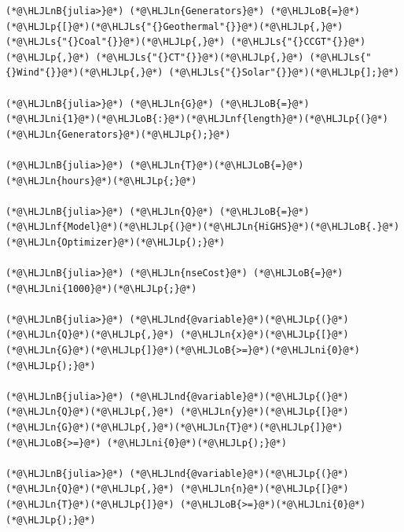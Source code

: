 \documentclass[12pt,a4paper]{article}
\newcommand{\HLJLn}[1]{#1}
\newcommand{\HLJLnd}[1]{\textcolor[RGB]{214,102,97}{#1}}
\newcommand{\HLJLnf}[1]{\textcolor[RGB]{66,102,213}{#1}}
\newcommand{\HLJLs}[1]{\textcolor[RGB]{201,61,57}{#1}}
\newcommand{\HLJLnB}[1]{\textcolor[RGB]{59,151,46}{#1}}
\newcommand{\HLJLni}[1]{\textcolor[RGB]{59,151,46}{#1}}
\newcommand{\HLJLoB}[1]{\textcolor[RGB]{102,102,102}{\textbf{#1}}}
\newcommand{\HLJLp}[1]{#1}
\begin{document}
\begin{lstlisting}
(*@\HLJLnB{julia>}@*) (*@\HLJLn{Generators}@*) (*@\HLJLoB{=}@*) (*@\HLJLp{[}@*)(*@\HLJLs{"{}Geothermal"{}}@*)(*@\HLJLp{,}@*) (*@\HLJLs{"{}Coal"{}}@*)(*@\HLJLp{,}@*) (*@\HLJLs{"{}CCGT"{}}@*)(*@\HLJLp{,}@*) (*@\HLJLs{"{}CT"{}}@*)(*@\HLJLp{,}@*) (*@\HLJLs{"{}Wind"{}}@*)(*@\HLJLp{,}@*) (*@\HLJLs{"{}Solar"{}}@*)(*@\HLJLp{];}@*)

(*@\HLJLnB{julia>}@*) (*@\HLJLn{G}@*) (*@\HLJLoB{=}@*) (*@\HLJLni{1}@*)(*@\HLJLoB{:}@*)(*@\HLJLnf{length}@*)(*@\HLJLp{(}@*)(*@\HLJLn{Generators}@*)(*@\HLJLp{);}@*)

(*@\HLJLnB{julia>}@*) (*@\HLJLn{T}@*)(*@\HLJLoB{=}@*) (*@\HLJLn{hours}@*)(*@\HLJLp{;}@*)

(*@\HLJLnB{julia>}@*) (*@\HLJLn{Q}@*) (*@\HLJLoB{=}@*) (*@\HLJLnf{Model}@*)(*@\HLJLp{(}@*)(*@\HLJLn{HiGHS}@*)(*@\HLJLoB{.}@*)(*@\HLJLn{Optimizer}@*)(*@\HLJLp{);}@*)

(*@\HLJLnB{julia>}@*) (*@\HLJLn{nseCost}@*) (*@\HLJLoB{=}@*) (*@\HLJLni{1000}@*)(*@\HLJLp{;}@*)

(*@\HLJLnB{julia>}@*) (*@\HLJLnd{@variable}@*)(*@\HLJLp{(}@*)(*@\HLJLn{Q}@*)(*@\HLJLp{,}@*) (*@\HLJLn{x}@*)(*@\HLJLp{[}@*)(*@\HLJLn{G}@*)(*@\HLJLp{]}@*)(*@\HLJLoB{>=}@*)(*@\HLJLni{0}@*)(*@\HLJLp{);}@*)

(*@\HLJLnB{julia>}@*) (*@\HLJLnd{@variable}@*)(*@\HLJLp{(}@*)(*@\HLJLn{Q}@*)(*@\HLJLp{,}@*) (*@\HLJLn{y}@*)(*@\HLJLp{[}@*)(*@\HLJLn{G}@*)(*@\HLJLp{,}@*)(*@\HLJLn{T}@*)(*@\HLJLp{]}@*) (*@\HLJLoB{>=}@*) (*@\HLJLni{0}@*)(*@\HLJLp{);}@*)

(*@\HLJLnB{julia>}@*) (*@\HLJLnd{@variable}@*)(*@\HLJLp{(}@*)(*@\HLJLn{Q}@*)(*@\HLJLp{,}@*) (*@\HLJLn{n}@*)(*@\HLJLp{[}@*)(*@\HLJLn{T}@*)(*@\HLJLp{]}@*) (*@\HLJLoB{>=}@*)(*@\HLJLni{0}@*)(*@\HLJLp{);}@*)


\end{lstlisting}
\end{document}
